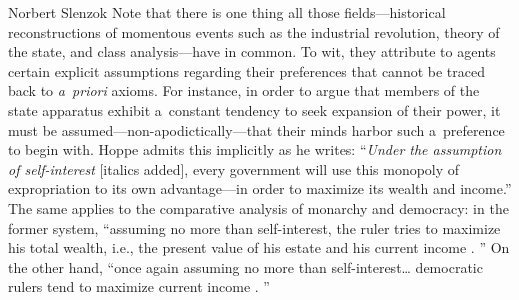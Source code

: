 \begin{artengenv}{Norbert Slenzok}
Note that there is one thing all those fields---historical reconstructions of momentous events such as the industrial revolution, theory of the state, and class analysis---have in common. To wit, they attribute to agents certain explicit assumptions regarding their preferences that cannot be traced back to \textit{a~priori} axioms. For instance, in order to argue that members of the state apparatus exhibit a~constant tendency to seek expansion of their power, it must be assumed---non-apodictically---that their minds harbor such a~preference to begin with. Hoppe 
\parencite*[][p.15]{hoppe_democracy_2007} %
 admits this implicitly as he writes: ``\textit{Under the assumption of self-interest} [italics added], every government will use this monopoly of expropriation to its own advantage---in order to maximize its wealth and income.'' The same applies to the comparative analysis of monarchy and democracy: in the former system, ``assuming no more than self-interest, the ruler tries to maximize his total wealth, i.e., the present value of his estate and his current income 
\parencite[][p.18]{hoppe_democracy_2007}.%
'' On the other hand, ``once again assuming no more than self-interest… democratic rulers tend to maximize current income 
\parencite[][p.144]{hoppe_democracy_2007}.%
''




\end{artengenv}
